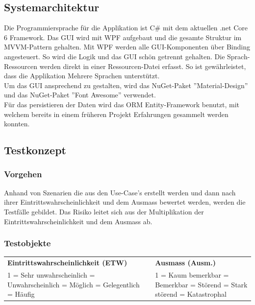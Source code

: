 \subsection{Systemarchitektur}
Die Programmiersprache für die Applikation ist C\# mit dem aktuellen .net Core 6 Framework. Das GUI wird mit WPF aufgebaut und die gesamte Struktur im MVVM-Pattern gehalten. Mit WPF werden alle GUI-Komponenten über Binding angesteuert. So wird die Logik und das GUI schön getrennt gehalten. Die Sprach-Ressourcen werden direkt in einer Ressourcen-Datei erfasst. So ist gewährleistet, dass die Applikation Mehrere Sprachen unterstützt. \\ Um das GUI ansprechend zu gestalten, wird das NuGet-Paket ''Material-Design'' und das NuGet-Paket ''Font Awesome'' verwendet.\\
Für das persistieren der Daten wird das ORM Entity-Framework benutzt, mit welchem bereits in einem früheren Projekt Erfahrungen gesammelt werden konnten.

\newpage
\subsection{Testkonzept} \label{testkonzept}
\subsubsection{Vorgehen}
Anhand von Szenarien die aus den Use-Case's erstellt werden und dann nach ihrer Eintrittswahrscheinlichkeit und dem Ausmass bewertet werden, werden die Testfälle gebildet. Das Risiko leitet sich aus der Multiplikation der Eintrittswahrscheinlichkeit und dem Ausmass ab.
\subsubsection{Testobjekte}
\begin{table}[H]
  \centering
  \setlength\extrarowheight{2pt}
  \begin{tabulary}{1.0\textwidth}{LCL}
    \textbf{Eintrittswahrscheinlichkeit (ETW)} & &
    \textbf{Ausmass (Ausm.)} \\
    1 = Sehr unwahrscheinlich = Unwahrscheinlich = Möglich = Gelegentlich = Häufig && 1 = Kaum bemerkbar = Bemerkbar  = Störend  = Stark störend  = Katastrophal\\
  \end{tabulary}
\end{table}

